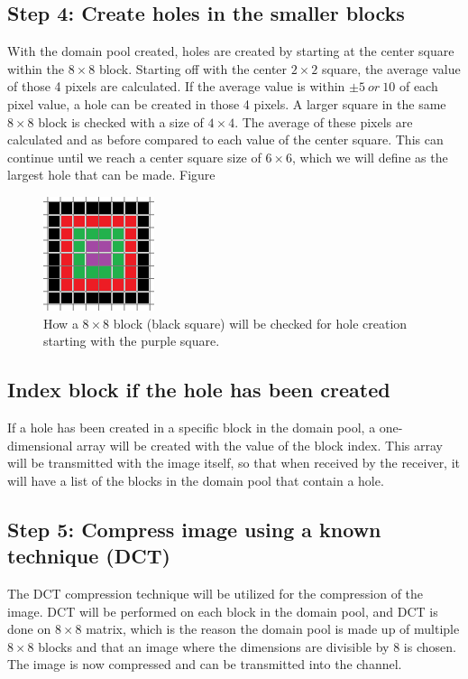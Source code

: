 \documentclass[10pt,twocolumn]{witseiepaper}
\begin{document}
\subsection{Step 4: Create holes in the smaller blocks}
\label{sec: Step 4}
With the domain pool created, holes are created by starting at the center square within the $8\times 8$ block. Starting off with the center $2\times 2$ square, the average value of those 4 pixels are calculated. If the average value is within $\pm 5\ or\ 10$ of each pixel value, a hole can be created in those 4 pixels. A larger square in the same $8\times 8$ block is checked with a size of $4\times 4$. The average of these pixels are calculated and as before compared to each value of the center square. This can continue until we reach a center square size of $6\times 6$, which we will define as the largest hole that can be made. Figure
\begin{figure}[h!]
\renewcommand{\thefigure}{\arabic{figure}}
\centering
\includegraphics[scale=1.5]{Grid.png}
\caption{How a $8\times 8$ block (black square) will be checked for hole creation starting with the purple square.}
\label{fig: Grid}
\end{figure}

\subsection{Index block if the hole has been created}
\label{sec: Index Block}
If a hole has been created in a specific block in the domain pool, a one-dimensional array will be created with the value of the block index. This array will be transmitted with the image itself, so that when received by the receiver, it will have a list of the blocks in the domain pool that contain a hole.

\subsection{Step 5: Compress image using a known technique (DCT)}
\label{sec: Step 5}
The DCT compression technique will be utilized for the compression of the image. DCT will be performed on each block in the domain pool, and DCT is done on $8\times 8$ matrix, which is the reason the domain pool is made up of multiple $8\times 8$ blocks and that an image where the dimensions are divisible by 8 is chosen. The image is now compressed and can be transmitted into the channel.
\end{document}
